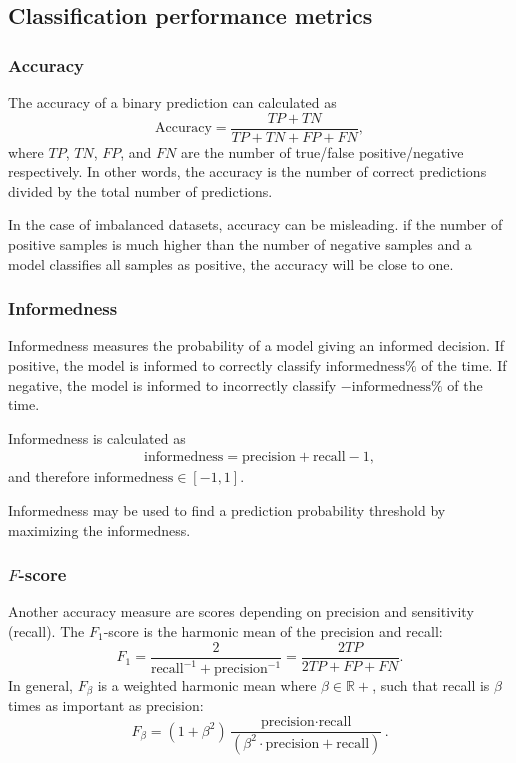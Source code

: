\subsection{Classification performance metrics}

\subsubsection{Accuracy}

The accuracy of a binary prediction can calculated as
\begin{equation}
    \text{Accuracy} = \frac{TP + TN}{TP + TN + FP + FN},
\end{equation}
where $TP$, $TN$, $FP$, and $FN$ are the number of true/false positive/negative respectively.
In other words, the accuracy is the number of correct predictions divided by the total number of predictions.

In the case of imbalanced datasets, accuracy can be misleading.
\eg if the number of positive samples is much higher than the number of negative samples and a model classifies all samples as positive, the accuracy will be close to one.

\subsubsection{Informedness}
Informedness measures the probability of a model giving an informed decision.
If positive, the model is informed to correctly classify $\mathrm{informedness}\unit{\percent}$ of the time.
If negative, the model is informed to incorrectly classify $-\mathrm{informedness}\unit{\percent}$ of the time.

Informedness is calculated as
\begin{align}
    \mathrm{informedness} = \mathrm{precision} + \mathrm{recall} - 1,
\end{align}
and therefore $\mathrm{informedness} \in [-1, 1]$.

Informedness may be used to find a prediction probability threshold by maximizing the informedness.

\subsubsection{$F$-score}

Another accuracy measure are scores depending on precision and sensitivity (recall).
The $F_1$-score is the harmonic mean of the precision and recall:
\begin{equation}
    F_1 = \frac{2}{\text{recall}^{-1} + \text{precision}^{-1}} = \frac{2 TP}{2 TP + FP + FN}.
\end{equation}
In general, $F_\beta$ is a weighted harmonic mean where $\beta\in\mathbb{R}+$, such that recall is $\beta$ times as important as precision:
\begin{equation}
    F_\beta = (1+\beta^2)\frac{\text{precision}\cdot\text{recall}}{(\beta^2\cdot\text{precision}+\text{recall})}.
\end{equation} 

